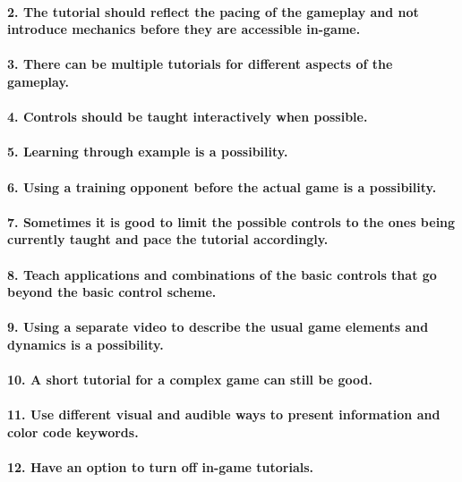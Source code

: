 \paragraph{2. The tutorial should reflect the pacing of the gameplay and not introduce mechanics before they are accessible in-game.}
\paragraph{3. There can be multiple tutorials for different aspects of the gameplay.}
\paragraph{4. Controls should be taught interactively when possible.}
\paragraph{5. Learning through example is a possibility.}
\paragraph{6. Using a training opponent before the actual game is a possibility.}
\paragraph{7. Sometimes it is good to limit the possible controls to the ones being currently taught and pace the tutorial accordingly.}
\paragraph{8. Teach applications and combinations of the basic controls that go beyond the basic control scheme.}
\paragraph{9. Using a separate video to describe the usual game elements and dynamics is a possibility.}
\paragraph{10. A short tutorial for a complex game can still be good.}
\paragraph{11. Use different visual and audible ways to present information and color code keywords.}
\paragraph{12. Have an option to turn off in-game tutorials.}
